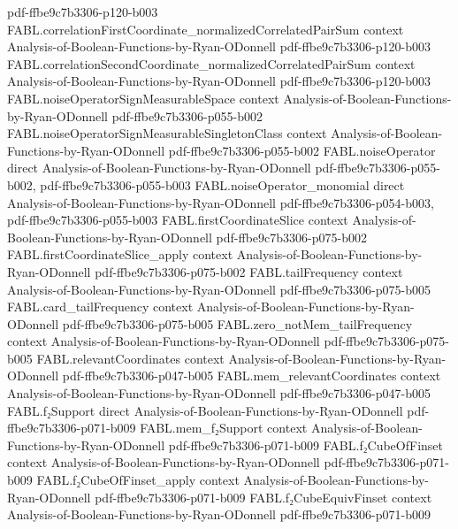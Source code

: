 \begin{theorem}
  {pdf-ffbe9c7b3306-p120-b003}
\proofstep
  {FABL.correlationFirstCoordinate_normalizedCorrelatedPairSum}
  {context}
  {Analysis-of-Boolean-Functions-by-Ryan-ODonnell}
  {pdf-ffbe9c7b3306-p120-b003}
\proofstep
  {FABL.correlationSecondCoordinate_normalizedCorrelatedPairSum}
  {context}
  {Analysis-of-Boolean-Functions-by-Ryan-ODonnell}
  {pdf-ffbe9c7b3306-p120-b003}
\proofstep
  {FABL.noiseOperatorSignMeasurableSpace}
  {context}
  {Analysis-of-Boolean-Functions-by-Ryan-ODonnell}
  {pdf-ffbe9c7b3306-p055-b002}
\proofstep
  {FABL.noiseOperatorSignMeasurableSingletonClass}
  {context}
  {Analysis-of-Boolean-Functions-by-Ryan-ODonnell}
  {pdf-ffbe9c7b3306-p055-b002}
\proofstep
  {FABL.noiseOperator}
  {direct}
  {Analysis-of-Boolean-Functions-by-Ryan-ODonnell}
  {pdf-ffbe9c7b3306-p055-b002,
    pdf-ffbe9c7b3306-p055-b003}
\proofstep
  {FABL.noiseOperator_monomial}
  {direct}
  {Analysis-of-Boolean-Functions-by-Ryan-ODonnell}
  {pdf-ffbe9c7b3306-p054-b003,
    pdf-ffbe9c7b3306-p055-b003}
\proofstep
  {FABL.firstCoordinateSlice}
  {context}
  {Analysis-of-Boolean-Functions-by-Ryan-ODonnell}
  {pdf-ffbe9c7b3306-p075-b002}
\proofstep
  {FABL.firstCoordinateSlice_apply}
  {context}
  {Analysis-of-Boolean-Functions-by-Ryan-ODonnell}
  {pdf-ffbe9c7b3306-p075-b002}
\proofstep
  {FABL.tailFrequency}
  {context}
  {Analysis-of-Boolean-Functions-by-Ryan-ODonnell}
  {pdf-ffbe9c7b3306-p075-b005}
\proofstep
  {FABL.card_tailFrequency}
  {context}
  {Analysis-of-Boolean-Functions-by-Ryan-ODonnell}
  {pdf-ffbe9c7b3306-p075-b005}
\proofstep
  {FABL.zero_notMem_tailFrequency}
  {context}
  {Analysis-of-Boolean-Functions-by-Ryan-ODonnell}
  {pdf-ffbe9c7b3306-p075-b005}
\proofstep
  {FABL.relevantCoordinates}
  {context}
  {Analysis-of-Boolean-Functions-by-Ryan-ODonnell}
  {pdf-ffbe9c7b3306-p047-b005}
\proofstep
  {FABL.mem_relevantCoordinates}
  {context}
  {Analysis-of-Boolean-Functions-by-Ryan-ODonnell}
  {pdf-ffbe9c7b3306-p047-b005}
\proofstep
  {FABL.f₂Support}
  {direct}
  {Analysis-of-Boolean-Functions-by-Ryan-ODonnell}
  {pdf-ffbe9c7b3306-p071-b009}
\proofstep
  {FABL.mem_f₂Support}
  {context}
  {Analysis-of-Boolean-Functions-by-Ryan-ODonnell}
  {pdf-ffbe9c7b3306-p071-b009}
\proofstep
  {FABL.f₂CubeOfFinset}
  {context}
  {Analysis-of-Boolean-Functions-by-Ryan-ODonnell}
  {pdf-ffbe9c7b3306-p071-b009}
\proofstep
  {FABL.f₂CubeOfFinset_apply}
  {context}
  {Analysis-of-Boolean-Functions-by-Ryan-ODonnell}
  {pdf-ffbe9c7b3306-p071-b009}
\proofstep
  {FABL.f₂CubeEquivFinset}
  {context}
  {Analysis-of-Boolean-Functions-by-Ryan-ODonnell}
  {pdf-ffbe9c7b3306-p071-b009}
\proofstep

\end{theorem}
